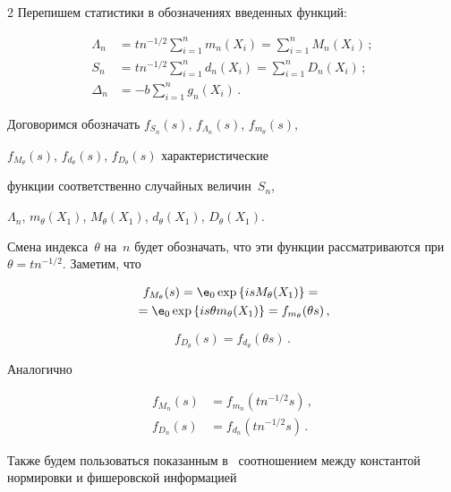 \begin{multicols}{2}
Перепишем статистики в обозначениях введенных функций:


\begin{align}


\Lambda_n &= tn^{-1/2} \sum\limits_{i=1}^n m_n(X_i) = \sum\limits_{i=1}^n M_n(X_i)\,; \label{l13}\\


S_n &= tn^{-1/2} \sum\limits_{i=1}^n d_n(X_i) = \sum\limits_{i=1}^n D_n(X_i)\,; \label{l14}\\


\Delta_n &= -b\sum\limits_{i=1}^n g_n(X_i)\,. \label{l15}


\end{align}


Договоримся обозначать $f_{S_n}(s)$, $f_{\Lambda_n}(s)$, $f_{m_{\theta}}(s)$, 


$f_{M_{\theta}}(s)$, $f_{d_{\theta}}(s)$, $f_{D_{\theta}}(s)$ характеристические


 функции соответственно случайных величин~$S_n$, 


$\Lambda_n$, $m_{\theta}(X_1)$, $M_{\theta}(X_1)$, $d_{\theta}(X_1)$, $D_{\theta}(X_1)$. 


Смена индекса~$\theta$ на~$n$ будет обозначать, что эти функции рассматриваются при $\theta=tn^{-1/2}$. Заметим, что


\begin{multline*}


f_{M_{\theta}}(s) = {\e}_0 \exp\left\{isM_{\theta}(X_1)\right\} ={}\\


{}= {\e}_0 \exp\left\{is\theta m_{\theta}(X_1)\right\} = f_{m_{\theta}}(\theta s)\,,


\end{multline*}


$$


f_{D_{\theta}}(s) = f_{d_{\theta}}(\theta s)\,.


$$


Аналогично


\begin{align}


f_{M_n}(s) & = f_{m_n}(tn^{-1/2}s)\,, \label{l16}\\


f_{D_n}(s)&= f_{d_n}(tn^{-1/2}s)\,. \label{l17}


\end{align}


Также будем пользоваться показанным в~\cite{article} соотношением между константой нормировки и фишеровской информацией



\end{multicols}
